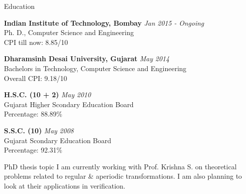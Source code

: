 \documentclass{resume} %
\begin{document}

\begin{rSection}{Education}

{\bf Indian Institute of Technology, Bombay} \hfill {\em Jan 2015 - Ongoing} \\ 
Ph. D., Computer Science and Engineering \\
CPI till now: 8.85/10

{\bf Dharamsinh Desai University, Gujarat} \hfill {\em May 2014} \\ 
Bachelors in Technology, Computer Science and Engineering \\
Overall CPI: 9.18/10

{\bf H.S.C. (10 + 2)} \hfill {\em May 2010} \\
Gujarat Higher Scondary Education Board \\
Percentage: 88.89\%

{\bf S.S.C. (10) } \hfill {\em May 2008} \\ 
Gujarat Scondary Education Board \\
Percentage: 92.31\%

\end{rSection}


\begin{rSection}{PhD thesis topic}
	I am currently working with Prof. Krishna S. on theoretical problems related to regular \& aperiodic transformations. I am also planning to look at their applications in verification.
\end{rSection}
\end{document}
